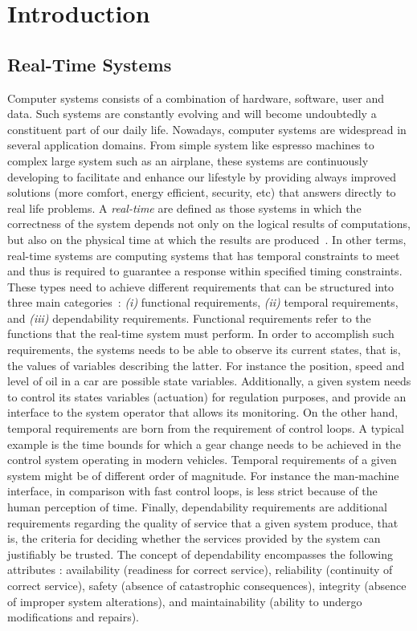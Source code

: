 \chapter{Introduction}

\section{Real-Time Systems}

Computer systems consists of a combination of hardware, software, user and data. Such
systems are constantly evolving and will become undoubtedly a constituent part of our daily life.
Nowadays, computer systems are widespread in several application domains. From simple system
like espresso machines to complex large system such as an airplane, these systems are
continuously developing to facilitate and enhance our lifestyle by providing always improved 
solutions (more comfort, energy efficient, security, etc) that answers directly to real life 
problems.  
A \emph{real-time} are defined as those systems in which the correctness of the system
depends not only on the logical results of computations, but also on the physical time at which 
the results are produced~\cite{intro:stan88}.
In other terms, real-time systems are computing systems that has temporal constraints to meet
and thus is required to guarantee a response within specified timing constraints. 
These types need to achieve different requirements that can be structured into three main 
categories~\cite{intro:kopetz11}: \emph{(i)} functional requirements, 
\emph{(ii)} temporal requirements, and \emph{(iii)} dependability requirements.
Functional requirements refer to the functions that the real-time system must perform. 
In order to accomplish such requirements, the systems needs to be able to observe its current
states, that is, the values of variables describing the latter. For instance the position, speed
and level of oil in a car are possible state variables. Additionally, a given system 
needs to control its states variables (actuation) for regulation purposes, and provide an 
interface to the system operator that allows its monitoring.
On the other hand, temporal requirements are born from the requirement of control loops. 
A typical example is the time bounds for which a gear change needs to be achieved in the control
system operating in modern vehicles. Temporal requirements of a given system might be of
different order of magnitude. For instance the man-machine interface, in comparison with fast
control loops, is less strict because of the human perception of time. Finally, dependability
requirements are additional requirements regarding the quality of service that a given system
produce, that is, the criteria for deciding whether the services provided by the system can 
justifiably be trusted. The concept of dependability encompasses the following attributes
\cite{intro:aviz04}: availability (readiness for correct service), reliability (continuity of
correct service), safety (absence of catastrophic consequences), integrity (absence of 
improper system alterations), and maintainability (ability to undergo modifications and repairs).

